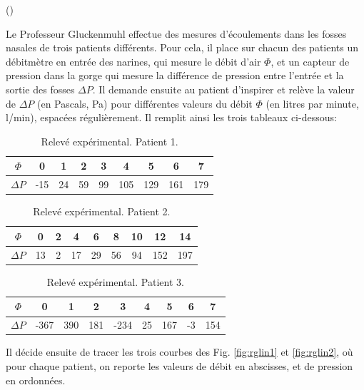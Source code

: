 \begin{exercice}\label{exo2-1} (\minsyndical)

Le Professeur Gluckenmuhl effectue des mesures d'\'ecoulements dans les fosses nasales
de trois patients diff\'erents. Pour cela, il place sur chacun des patients un d\'ebitm\`etre en 
entr\'ee des narines, qui mesure le d\'ebit d'air $\Phi$, et un capteur de pression dans la gorge 
qui mesure la diff\'erence de pression entre l'entr\'ee et la sortie des fosses $\Delta P$. Il demande
ensuite au patient d'inspirer et rel\`eve la valeur de $\Delta P$ (en Pascals, Pa) pour diff\'erentes valeurs du d\'ebit $\Phi$ (en litres par minute, l/min), espac\'ees r\'eguli\`erement. 
Il remplit ainsi les trois tableaux ci-dessous:\\

\begin{table}[h]
\center
\begin{tabular}{|c|cccccccc|}
\hline
$\Phi$ & 0 & 1 & 2 & 3 & 4 & 5 & 6 & 7 \\ \hline
$\Delta P$ & -15  & 24 & 59  & 99 & 105 & 129 & 161 & 179 \\ \hline
\end{tabular}
\caption{Relev\'e exp\'erimental. Patient 1.}
\end{table}

\begin{table}[h]
\center
\begin{tabular}{|c|cccccccc|}
\hline
$\Phi$ & 0 & 2 & 4 & 6 & 8 & 10 & 12 & 14 \\ \hline
$\Delta P$ & 13 & 2 & 17 & 29 & 56 & 94 & 152 & 197 \\ \hline
\end{tabular}
\caption{Relev\'e exp\'erimental. Patient 2.}
\end{table}

\begin{table}[h]
\center
\begin{tabular}{|c|cccccccc|}
\hline
$\Phi$ & 0 & 1 & 2 & 3 & 4 & 5 & 6 & 7 \\ \hline
$\Delta P$ & -367 & 390 & 181 & -234 & 25 & 167 & -3 & 154 \\ \hline
\end{tabular}
\caption{Relev\'e exp\'erimental. Patient 3.}
\end{table}

Il d\'ecide ensuite de tracer les trois courbes des Fig. \ref{fig:rglin1} et
\ref{fig:rglin2}, o\`u pour chaque patient, on reporte
les valeurs de d\'ebit en abscisses, et de pression en ordonn\'ees.


\end{exercice}
